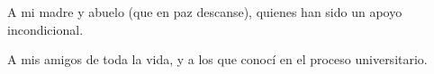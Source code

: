 \begin{agradecimiento}

A mi madre y abuelo (que en paz descanse), quienes han sido un apoyo incondicional. 

A mis amigos de toda la vida, y a los que conocí en el proceso universitario.

\end{agradecimiento}